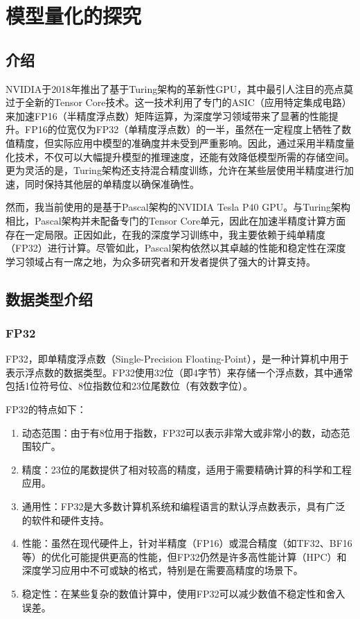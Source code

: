 \chapter{模型量化的探究}
\label{chapter:6}

\section{介绍}

NVIDIA于2018年推出了基于Turing架构的革新性GPU，其中最引人注目的亮点莫过于全新的Tensor Core技术。这一技术利用了专门的ASIC（应用特定集成电路）来加速FP16（半精度浮点数）矩阵运算，为深度学习领域带来了显著的性能提升。FP16的位宽仅为FP32（单精度浮点数）的一半，虽然在一定程度上牺牲了数值精度，但实际应用中模型的准确度并未受到严重影响。因此，通过采用半精度量化技术，不仅可以大幅提升模型的推理速度，还能有效降低模型所需的存储空间。更为灵活的是，Turing架构还支持混合精度训练，允许在某些层使用半精度进行加速，同时保持其他层的单精度以确保准确性。

然而，我当前使用的是基于Pascal架构的NVIDIA Tesla P40 GPU。与Turing架构相比，Pascal架构并未配备专门的Tensor Core单元，因此在加速半精度计算方面存在一定局限。正因如此，在我的深度学习训练中，我主要依赖于纯单精度（FP32）进行计算。尽管如此，Pascal架构依然以其卓越的性能和稳定性在深度学习领域占有一席之地，为众多研究者和开发者提供了强大的计算支持。

\section{数据类型介绍}

\subsection{FP32}

FP32，即单精度浮点数（Single-Precision Floating-Point），是一种计算机中用于表示浮点数的数据类型。FP32使用32位（即4字节）来存储一个浮点数，其中通常包括1位符号位、8位指数位和23位尾数位（有效数字位）。

FP32的特点如下：

\begin{enumerate}
	\item 动态范围：由于有8位用于指数，FP32可以表示非常大或非常小的数，动态范围较广。
	\item 精度：23位的尾数提供了相对较高的精度，适用于需要精确计算的科学和工程应用。
	\item 通用性：FP32是大多数计算机系统和编程语言的默认浮点数表示，具有广泛的软件和硬件支持。
	\item 性能：虽然在现代硬件上，针对半精度（FP16）或混合精度（如TF32、BF16等）的优化可能提供更高的性能，但FP32仍然是许多高性能计算（HPC）和深度学习应用中不可或缺的格式，特别是在需要高精度的场景下。
	\item 稳定性：在某些复杂的数值计算中，使用FP32可以减少数值不稳定性和舍入误差。
\end{enumerate}

